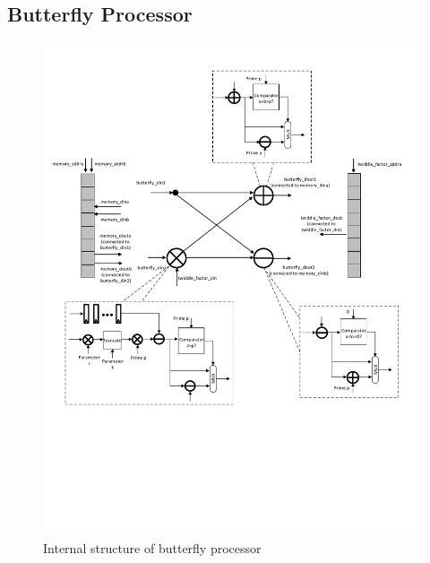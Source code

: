 \documentclass[submission]{iacrtrans}
\theoremstyle{plain}
\begin{document}
\subsection{Butterfly Processor}\label{sec:butterfly processor}
\begin{figure}[!tb]
\centering
\includegraphics[width=\textwidth]{./fig/processor.pdf}
\caption{Internal structure of butterfly processor}\label{fig:butterfly_processor}
\end{figure}
\end{document}
